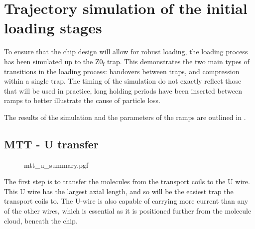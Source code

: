 

\section{Trajectory simulation of the initial loading stages}

To ensure that the chip design will allow for robust loading, the loading
process has been simulated up to the $\mathrm{Z0_f}$ trap. This demonstrates
the two main types of transitions in the loading process: handovers between
traps, and compression within a single trap. The timing of the simulation do
not exactly reflect those that will be used in practice, long holding periods
have been inserted between ramps to better illustrate the cause of particle
loss.

The results of the simulation and the parameters of the ramps are outlined in
.



\subsection{MTT - U transfer}
\label{design:sim:trans_U}

\begin{figure}[p]
\centering
  {mtt_u_summary.pgf}
  \caption{
  }
  \label{design:fig:mttusum}
\end{figure}




%
The first step is to transfer the molecules from the transport coils to the U
wire. This U wire has the largest axial length, and so will be the easiest trap
the transport coils to. The U-wire is also capable of carrying more current
than any of the other wires, which is essential as it is positioned further
from the molecule cloud, beneath the chip.

